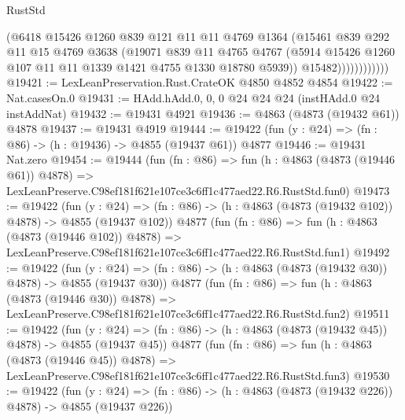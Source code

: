 \begin{lexlean}{RustStd}
\begin{coremodule}
                        (@6418
                          @15426
                          @1260
                          @839
                          @121
                          @11
                          @11
                          @4769
                          @1364
                          (@15461
                            @839
                            @292
                            @11
                            @15
                            @4769
                            @3638
                            (@19071
                              @839
                              @11
                              @4765
                              @4767
                              (@5914
                                @15426
                                @1260
                                @107
                                @11
                                @11
                                @1339
                                @1421
                                @4755
                                @1330
                                @18780
                                @5939))
                            @15482))))))))))))
@19421 := LexLeanPreservation.Rust.CrateOK @4850 @4852 @4854
@19422 := Nat.casesOn.{0}
@19431 := HAdd.hAdd.{0, 0, 0} @24 @24 @24 (instHAdd.{0} @24 instAddNat)
@19432 := @19431 @4921
@19436 := @4863 (@4873 (@19432 @61)) @4878
@19437 := @19431 @4919
@19444 := @19422 (fun (y : @24) => (fn : @86) -> (h : @19436) -> @4855 (@19437 @61)) @4877
@19446 := @19431 Nat.zero
@19454 := @19444
    (fun (fn : @86) =>
    fun (h : @4863 (@4873 (@19446 @61)) @4878) =>
    LexLeanPreserve.C98ef181f621e107ce3c6ff1c477aed22.R6.RustStd.fun0)
@19473 := @19422
    (fun (y : @24) => (fn : @86) -> (h : @4863 (@4873 (@19432 @102)) @4878) -> @4855 (@19437 @102))
    @4877
    (fun (fn : @86) =>
    fun (h : @4863 (@4873 (@19446 @102)) @4878) =>
    LexLeanPreserve.C98ef181f621e107ce3c6ff1c477aed22.R6.RustStd.fun1)
@19492 := @19422
    (fun (y : @24) => (fn : @86) -> (h : @4863 (@4873 (@19432 @30)) @4878) -> @4855 (@19437 @30))
    @4877
    (fun (fn : @86) =>
    fun (h : @4863 (@4873 (@19446 @30)) @4878) =>
    LexLeanPreserve.C98ef181f621e107ce3c6ff1c477aed22.R6.RustStd.fun2)
@19511 := @19422
    (fun (y : @24) => (fn : @86) -> (h : @4863 (@4873 (@19432 @45)) @4878) -> @4855 (@19437 @45))
    @4877
    (fun (fn : @86) =>
    fun (h : @4863 (@4873 (@19446 @45)) @4878) =>
    LexLeanPreserve.C98ef181f621e107ce3c6ff1c477aed22.R6.RustStd.fun3)
@19530 := @19422
    (fun (y : @24) => (fn : @86) -> (h : @4863 (@4873 (@19432 @226)) @4878) -> @4855 (@19437 @226))

\end{coremodule}
\end{lexlean}
